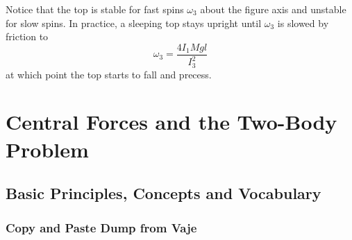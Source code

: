 \documentclass[11pt, a4paper]{article}
\begin{document}
\begin{itemize}
\begin{itemize}
	\end{itemize}
	Notice that the top is stable for fast spins $ \omega_{3} $ about the figure axis and unstable for slow spins. In practice, a sleeping top stays upright until $ \omega_{3} $ is slowed by friction to
	\begin{equation*}
		\omega_{3} = \frac{4I_{1}Mgl}{I_{3}^{2}} 
	\end{equation*}
	at which point the top starts to fall and precess.
	
	
\end{itemize}


\iffalse

\newpage
\section{Central Forces and the Two-Body Problem}

\subsection{Basic Principles, Concepts and Vocabulary}


\subsubsection{Copy and Paste Dump from Vaje}
\end{document}
